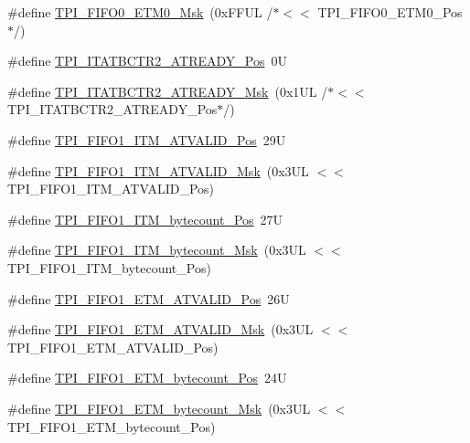 \begin{DoxyCompactItemize}
\#define \hyperlink{group___c_m_s_i_s___t_p_i_gaf924f7d1662f3f6c1da12052390cb118}{T\-P\-I\-\_\-\-F\-I\-F\-O0\-\_\-\-E\-T\-M0\-\_\-\-Msk}~(0x\-F\-F\-U\-L /$\ast$$<$$<$ T\-P\-I\-\_\-\-F\-I\-F\-O0\-\_\-\-E\-T\-M0\-\_\-\-Pos$\ast$/)
\item 
\#define \hyperlink{group___c_m_s_i_s___t_p_i_ga6959f73d7db4a87ae9ad9cfc99844526}{T\-P\-I\-\_\-\-I\-T\-A\-T\-B\-C\-T\-R2\-\_\-\-A\-T\-R\-E\-A\-D\-Y\-\_\-\-Pos}~0\-U
\item 
\#define \hyperlink{group___c_m_s_i_s___t_p_i_ga1859502749709a2e5ead9a2599d998db}{T\-P\-I\-\_\-\-I\-T\-A\-T\-B\-C\-T\-R2\-\_\-\-A\-T\-R\-E\-A\-D\-Y\-\_\-\-Msk}~(0x1\-U\-L /$\ast$$<$$<$ T\-P\-I\-\_\-\-I\-T\-A\-T\-B\-C\-T\-R2\-\_\-\-A\-T\-R\-E\-A\-D\-Y\-\_\-\-Pos$\ast$/)
\item 
\#define \hyperlink{group___c_m_s_i_s___t_p_i_ga08edfc862b2c8c415854cc4ae2067dfb}{T\-P\-I\-\_\-\-F\-I\-F\-O1\-\_\-\-I\-T\-M\-\_\-\-A\-T\-V\-A\-L\-I\-D\-\_\-\-Pos}~29\-U
\item 
\#define \hyperlink{group___c_m_s_i_s___t_p_i_gabc1f6a3b6cac0099d7c01ca949b4dd08}{T\-P\-I\-\_\-\-F\-I\-F\-O1\-\_\-\-I\-T\-M\-\_\-\-A\-T\-V\-A\-L\-I\-D\-\_\-\-Msk}~(0x3\-U\-L $<$$<$ T\-P\-I\-\_\-\-F\-I\-F\-O1\-\_\-\-I\-T\-M\-\_\-\-A\-T\-V\-A\-L\-I\-D\-\_\-\-Pos)
\item 
\#define \hyperlink{group___c_m_s_i_s___t_p_i_gaa22ebf7c86e4f4b2c98cfd0b5981375a}{T\-P\-I\-\_\-\-F\-I\-F\-O1\-\_\-\-I\-T\-M\-\_\-bytecount\-\_\-\-Pos}~27\-U
\item 
\#define \hyperlink{group___c_m_s_i_s___t_p_i_gacba2edfc0499828019550141356b0dcb}{T\-P\-I\-\_\-\-F\-I\-F\-O1\-\_\-\-I\-T\-M\-\_\-bytecount\-\_\-\-Msk}~(0x3\-U\-L $<$$<$ T\-P\-I\-\_\-\-F\-I\-F\-O1\-\_\-\-I\-T\-M\-\_\-bytecount\-\_\-\-Pos)
\item 
\#define \hyperlink{group___c_m_s_i_s___t_p_i_ga3177b8d815cf4a707a2d3d3d5499315d}{T\-P\-I\-\_\-\-F\-I\-F\-O1\-\_\-\-E\-T\-M\-\_\-\-A\-T\-V\-A\-L\-I\-D\-\_\-\-Pos}~26\-U
\item 
\#define \hyperlink{group___c_m_s_i_s___t_p_i_ga0e8f29a1e9378d1ceb0708035edbb86d}{T\-P\-I\-\_\-\-F\-I\-F\-O1\-\_\-\-E\-T\-M\-\_\-\-A\-T\-V\-A\-L\-I\-D\-\_\-\-Msk}~(0x3\-U\-L $<$$<$ T\-P\-I\-\_\-\-F\-I\-F\-O1\-\_\-\-E\-T\-M\-\_\-\-A\-T\-V\-A\-L\-I\-D\-\_\-\-Pos)
\item 
\#define \hyperlink{group___c_m_s_i_s___t_p_i_gaab31238152b5691af633a7475eaf1f06}{T\-P\-I\-\_\-\-F\-I\-F\-O1\-\_\-\-E\-T\-M\-\_\-bytecount\-\_\-\-Pos}~24\-U
\item 
\#define \hyperlink{group___c_m_s_i_s___t_p_i_gab554305459953b80554fdb1908b73291}{T\-P\-I\-\_\-\-F\-I\-F\-O1\-\_\-\-E\-T\-M\-\_\-bytecount\-\_\-\-Msk}~(0x3\-U\-L $<$$<$ T\-P\-I\-\_\-\-F\-I\-F\-O1\-\_\-\-E\-T\-M\-\_\-bytecount\-\_\-\-Pos)

\end{DoxyCompactItemize}
